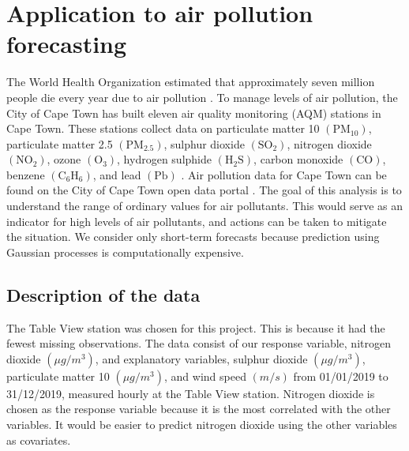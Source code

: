  \section{Application to air pollution forecasting}

   The World Health Organization estimated that approximately seven million people die every year due to air pollution \cite{CityofCapeTown2024}. To manage levels of air pollution, the City of Cape Town has built eleven air quality monitoring (AQM) stations in Cape Town. These stations collect data on particulate matter 10 $(\text{PM}_{10})$, particulate matter 2.5 $(\text{PM}_{2.5})$, sulphur dioxide $(\text{SO}_{2})$, nitrogen dioxide $(\text{NO}_{2})$, ozone $(\text{O}_{3})$, hydrogen sulphide $(\text{H}_{2}\text{S})$, carbon monoxide $(\text{CO})$, benzene $(\text{C}_{6}\text{H}_{6})$, and lead $(\text{Pb})$ \cite{CityofCapeTown2024}. Air pollution data for Cape Town can be found on the City of Cape Town open data portal \cite{CityofCapeTown2015}. The goal of this analysis is to understand the range of ordinary values for air pollutants. This would serve as an indicator for high levels of air pollutants, and actions can be taken to mitigate the situation. We consider only short-term forecasts because prediction using Gaussian processes is computationally expensive.
      
   \subsection{Description of the data}

      The Table View station was chosen for this project. This is because it had the fewest missing observations. The data consist of our response variable, nitrogen dioxide $(\mu g / m^3)$, and explanatory variables, sulphur dioxide $(\mu g / m^3)$, particulate matter 10 $(\mu g / m^3)$, and wind speed $(m/s)$ from 01/01/2019 to 31/12/2019, measured hourly at the Table View station. Nitrogen dioxide is chosen as the response variable because it is the most correlated with the other variables. It would be easier to predict nitrogen dioxide using the other variables as covariates.

